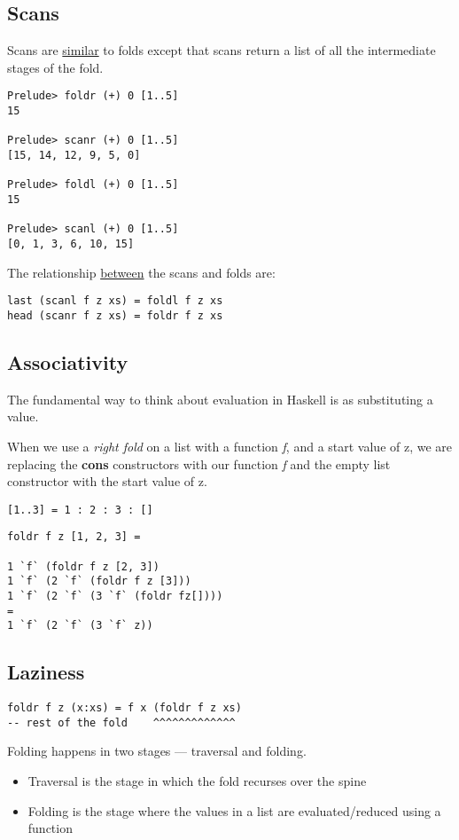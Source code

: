 \subsection{Scans}
Scans are \underline{similar} to folds except that scans return a list of all the intermediate stages of the fold. 
\begin{verbatim}
Prelude> foldr (+) 0 [1..5]
15

Prelude> scanr (+) 0 [1..5]
[15, 14, 12, 9, 5, 0]

Prelude> foldl (+) 0 [1..5]
15

Prelude> scanl (+) 0 [1..5]
[0, 1, 3, 6, 10, 15]
\end{verbatim}

The relationship \underline{between} the scans and folds are:
\begin{lstlisting}
last (scanl f z xs) = foldl f z xs
head (scanr f z xs) = foldr f z xs
\end{lstlisting}

\newpage
\subsection{Associativity}
The fundamental way to think about evaluation in Haskell is as substituting a value. 

When we use a \emph{right fold} on a list with a function \emph{f}, and a start value of z, we are replacing the \textbf{cons} constructors with our function \emph{f} and the empty list constructor with the start value of z.

\begin{verbatim}
[1..3] = 1 : 2 : 3 : []
\end{verbatim}

\begin{lstlisting}
foldr f z [1, 2, 3] =

1 `f` (foldr f z [2, 3])
1 `f` (2 `f` (foldr f z [3]))
1 `f` (2 `f` (3 `f` (foldr fz[])))
=
1 `f` (2 `f` (3 `f` z))
\end{lstlisting}


\subsection{Laziness}
\begin{lstlisting}
foldr f z (x:xs) = f x (foldr f z xs)
-- rest of the fold    ^^^^^^^^^^^^^
\end{lstlisting}
Folding happens in two stages --- traversal and folding.
\begin{itemize}
  \item Traversal is the stage in which the fold recurses over the spine
  \item Folding is the stage where the values in a list are evaluated/reduced using a function
\end{itemize}

